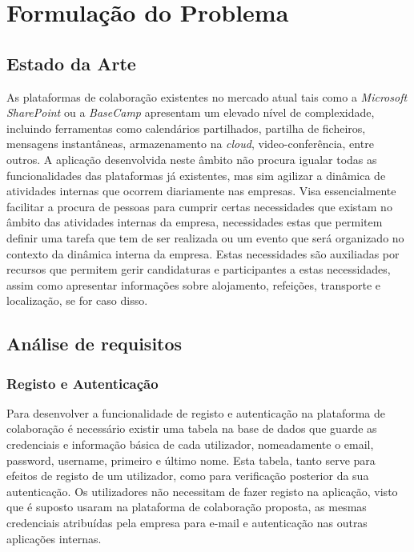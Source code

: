 \chapter{Formulação do Problema}\label{chapter:formulacaoDoProblema}

\section{Estado da Arte}\label{sec:estadoDaArte}
As plataformas de colaboração existentes no mercado atual tais como a \textit{Microsoft SharePoint} ou a \textit{BaseCamp} apresentam um elevado nível de complexidade, incluindo ferramentas como calendários partilhados, partilha de ficheiros, mensagens instantâneas, armazenamento na \textit{cloud}, video-conferência, entre outros. A aplicação desenvolvida neste âmbito não procura igualar todas as funcionalidades das plataformas já existentes, mas sim agilizar a dinâmica de atividades internas que ocorrem diariamente nas empresas. Visa essencialmente facilitar a procura de pessoas para cumprir certas necessidades que existam no âmbito das atividades internas da empresa, necessidades estas que permitem definir uma tarefa que tem de ser realizada ou um evento que será organizado no contexto da dinâmica interna da empresa. Estas necessidades são auxiliadas por recursos que permitem gerir candidaturas e participantes a estas necessidades, assim como apresentar informações sobre alojamento, refeições, transporte e localização, se for caso disso.

\section{Análise de requisitos}\label{sec:requisitos}

\subsection{Registo e Autenticação}\label{subsec:login}
Para desenvolver a funcionalidade de registo e autenticação na plataforma de colaboração é necessário existir uma tabela 
na base de dados que guarde as credenciais e informação básica de cada utilizador, nomeadamente 
o email, password, username, primeiro e último nome. 
Esta tabela, tanto serve para efeitos de registo de um utilizador, como para verificação posterior da sua autenticação. 
Os utilizadores não necessitam de fazer registo na aplicação, visto que é suposto usaram na plataforma de colaboração proposta, 
as mesmas credenciais atribuídas pela empresa para e-mail e autenticação nas outras aplicações internas.

